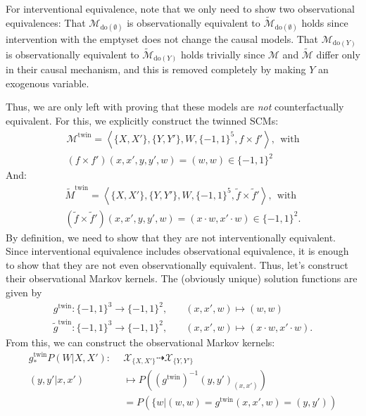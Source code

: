 \begin{gradedsolution}
\begin{enumerate}
	For interventional equivalence, note that we only need to show two observational equivalences: 
	That $\mathcal{M}_{\text{do}(\emptyset)}$ is observationally equivalent to $\widetilde{\mathcal{M}}_{\text{do}(\emptyset)}$ holds since intervention with the emptyset does not change the causal models.
	That $\mathcal{M}_{\text{do}(Y)}$ is observationally equivalent to $\widetilde{\mathcal{M}}_{\text{do}(Y)}$ holds trivially since $\mathcal{M}$ and $\widetilde{\mathcal{M}}$ differ only in their causal mechanism, and this is removed completely by making $Y$ an exogenous variable.

	Thus, we are only left with proving that these models are \emph{not} counterfactually equivalent. 
	For this, we explicitly construct the twinned SCMs:
	\begin{align*}
	  \mathcal{M}^{\text{twin}} = \left\langle \{X, X'\}, \{Y, Y'\}, W, \{-1,1\}^5, f \times f' \right\rangle, \ \ \text{with} \\
	  (f\times f')(x, x', y, y', w)  = (w, w) \in \{-1,1\}^2
	\end{align*}
	And:
	\begin{align*}
	  \widetilde{M}^{\text{twin}} = \left\langle \{X, X'\}, \{Y, Y'\}, W, \{-1,1\}^5, \widetilde{f} \times \widetilde{f}' \right\rangle, \ \ \text{with} \\
	  (\widetilde{f} \times \widetilde{f}')(x, x', y, y', w) = (x \cdot w, x' \cdot w) \in \{-1, 1\}^2.
	\end{align*}
	By definition, we need to show that they are not interventionally equivalent. 
	Since interventional equivalence includes observational equivalence, it is enough to show that they are not even observationally equivalent.
	Thus, let's construct their observational Markov kernels.
	The (obviously unique) solution functions are given by 
	\begin{align*}
	  g^{\text{twin}}: \{-1,1\}^3 \to \{-1,1\}^2, & \quad (x, x', w) \mapsto (w, w) \\
	  \widetilde{g}^{\text{twin}}: \{-1,1\}^3 \to \{-1,1\}^2, & \quad (x, x', w) \mapsto (x \cdot w, x' \cdot w).
	\end{align*}
	From this, we can construct the observational Markov kernels:
	\begin{align*}
	  g^{\text{twin}}_* P(W | X, X'): \ \ & \mathcal{X}_{\{X,X'\}} \dashrightarrow \mathcal{X}_{\{Y,Y'\}} \\
	  (y, y' | x, x') & \mapsto P\left((g^{\text{twin}})^{-1}(y, y')_{(x,x')}\right) \\
	  & = P\left(\{w | (w,w) = g^{\text{twin}}(x, x', w) = (y, y')\right) \\

\end{align*}
\end{enumerate}
\end{gradedsolution}
